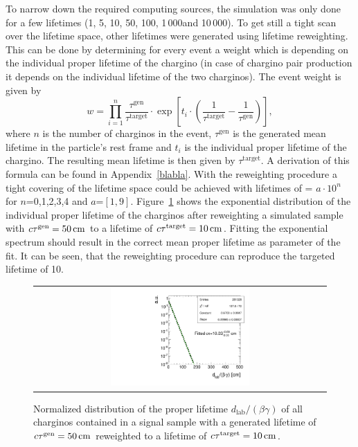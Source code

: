To narrow down the required computing sources, the simulation was only done for a few lifetimes (1\cm, 5\cm, 10\cm, 50\cm, 100\cm, 1\,000\cm and 10\,000\cm).
To get still a tight scan over the lifetime space, other lifetimes were generated using lifetime reweighting.
This can be done by determining for every event a weight which is depending on the individual proper lifetime of the chargino (in case of chargino pair production it depends on the individual lifetime of the two charginos).
The event weight is given by
\begin{equation*}
w = \prod_{i=1}^n \frac{\tau^{\text{gen}}}{\tau^{\text{target}}}\cdot  \exp \left[ t_i \cdot \left( \frac{1}{\tau^{\text{target}}} - \frac{1}{\tau^{\text{gen}}} \right) \right] ,
\end{equation*}
where $n$ is the  number of charginos in the event, $\tau^{\text{gen}}$ is the generated mean lifetime in the particle's rest frame and $t_i$ is the individual proper lifetime of the chargino. 
The resulting mean lifetime is then given by $\tau^{\text{target}}$. A derivation of this formula can be found in Appendix~\ref{blabla}.
With the reweighting procedure a tight covering of the lifetime space could be achieved with lifetimes of \ctau = $a\cdot10^{n}$ for $n$=0,1,2,3,4 and $a$=$\left[1,9\right]$.
Figure~\ref{fig:LifetimeReweighting} shows the exponential distribution of the individual proper lifetime of the charginos after reweighting a simulated sample with $c\tau^{\text{gen}}=50\,\text{cm}$ to a lifetime of $c\tau^{\text{target}}=10\,\text{cm}$.
Fitting the exponential spectrum should result in the correct mean proper lifetime as parameter of the fit.
It can be seen, that the reweighting procedure can reproduce the targeted lifetime of 10\cm.
\begin{figure}[!t]
  \centering 
  \begin{tabular}{c}
    \includegraphics[width=0.49\textwidth]{figures/analysis/10cm.pdf}
  \end{tabular}
  \caption{Normalized distribution of the proper lifetime $d_{\text{lab}}/\left(\beta\gamma \right)$ of all charginos contained in a signal sample with a generated lifetime of $c\tau^{\text{gen}}=50\,\text{cm}$ reweighted to a lifetime of $c\tau^{\text{target}}=10\,\text{cm}$.}
  \label{fig:LifetimeReweighting}
\end{figure}


